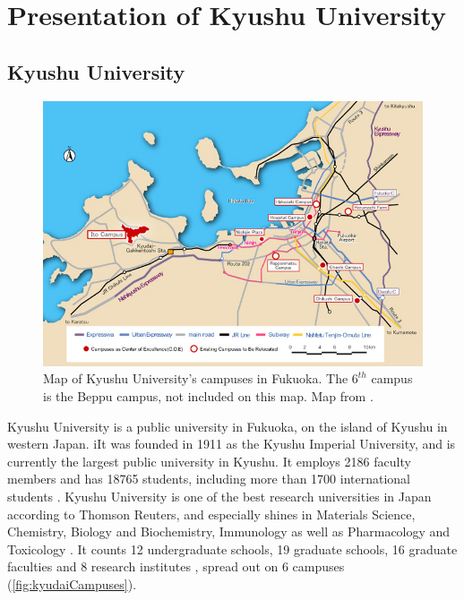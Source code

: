 \chapter{Presentation of Kyushu University}
\section{Kyushu University}
\begin{figure}[htb!]
\includegraphics[width=\textwidth]{images/campusesMap.jpg}
\caption{Map of Kyushu University's campuses in Fukuoka. The $6^{th}$ campus is the Beppu campus, not included on this map. Map from \cite{greenAsia} .}
\label{fig:kyudaiCampuses}
\end{figure}

Kyushu University is a public university in Fukuoka, on the island of Kyushu in western Japan. iIt was founded in 1911 as the Kyushu Imperial University, and is currently the largest public university in Kyushu. It employs 2186 faculty members and has 18765 students, including more than 1700 international students \cite{kyushuWebsiteHistory}. Kyushu University is one of the best research universities in Japan according to Thomson Reuters, and especially shines in Materials Science, Chemistry, Biology and Biochemistry, Immunology as well as Pharmacology and Toxicology \cite{reutersResearchRanking}. It counts 12 undergraduate schools, 19 graduate schools, 16 graduate faculties and 8 research institutes \cite{kyushuWebsiteFaculties}, spread out on 6 campuses (\autoref{fig:kyudaiCampuses}).

